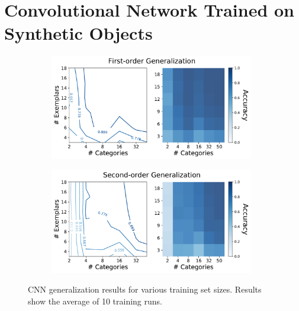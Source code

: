 \section{Convolutional Network Trained on Synthetic Objects}
\label{sec:simple_cnn}

\begin{figure}[t]
    \begin{center}
        \begin{subfigure}[b]{0.48\textwidth}
            \begin{center}
                \includegraphics[width=0.98\textwidth]
                {figures/cnn_o1_acc.pdf}
            \end{center}
        \end{subfigure}
        \begin{subfigure}[b]{0.48\textwidth}
            \begin{center}
                \includegraphics[width=0.98\textwidth]
                {figures/cnn_o2_acc.pdf}
            \end{center}
        \end{subfigure}
    \end{center}
    \caption{CNN generalization results for various training set sizes. Results
    show the average of 10 training runs.}
    \label{fig:cnn_gen_results}
\end{figure}

